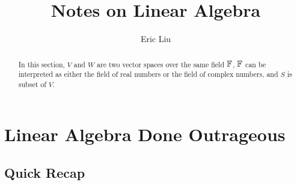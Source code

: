 \documentclass{report}
\title{Notes on Linear Algebra}
\author{Eric Liu}
\date{}
\begin{document}
\maketitle
\newpage%

\tableofcontents
\pagebreak
\chapter{Linear Algebra Done Outrageous}
\section{Quick Recap}
\begin{abstract}
In this section, $V$ and $W$ are two vector spaces over the same field $\mathbb{F}$, $\mathbb{F}$ can be interpreted as either the field of real numbers or the field of complex numbers, and $S$ is subset of  $V$.  
\end{abstract}
\end{document}
